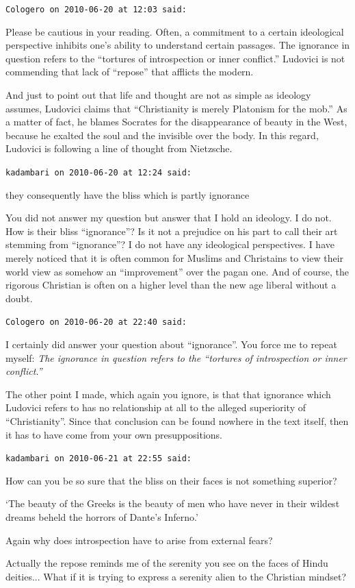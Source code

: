 \begin{footnotesize}
\begin{sffamily}
\hfill

\texttt{Cologero on 2010-06-20 at 12:03 said:}

Please be cautious in your reading. Often, a commitment to a certain ideological perspective inhibits one's ability to understand certain passages. The ignorance in question refers to the ``tortures of introspection or inner conflict.'' Ludovici is not commending that lack of ``repose'' that afflicts the modern.

And just to point out that life and thought are not as simple as ideology assumes, Ludovici claims that ``Christianity is merely Platonism for the mob.'' As a matter of fact, he blames Socrates for the disappearance of beauty in the West, because he exalted the soul and the invisible over the body. In this regard, Ludovici is following a line of thought from Nietzsche.

\hfill

\texttt{kadambari on 2010-06-20 at 12:24 said:}

they consequently have the bliss which is partly ignorance

You did not answer my question but answer that I hold an ideology. I do not. How is their bliss ``ignorance''? Is it not a prejudice on his part to call their art stemming from ``ignorance''? I do not have any ideological perspectives. I have merely noticed that it is often common for Muslims and Christains to view their world view as somehow an ``improvement'' over the pagan one. And of course, the rigorous Christian is often on a higher level than the new age liberal without a doubt.

\hfill

\texttt{Cologero on 2010-06-20 at 22:40 said:}

I certainly did answer your question about ``ignorance''. You force me to repeat myself: \emph{The ignorance in question refers to the ``tortures of introspection or inner conflict.''}

The other point I made, which again you ignore, is that that ignorance which Ludovici refers to has no relationship at all to the alleged superiority of ``Christianity''. Since that conclusion can be found nowhere in the text itself, then it has to have come from your own presuppositions.

\hfill

\texttt{kadambari on 2010-06-21 at 22:55 said:}

How can you be so sure that the bliss on their faces is not something superior?

`The beauty of the Greeks is the beauty of men who have never in their wildest dreams beheld the horrors of Dante's Inferno.'

Again why does introspection have to arise from external fears?

Actually the repose reminds me of the serenity you see on the faces of Hindu deities... What if it is trying to express a serenity alien to the Christian mindset?


\hfill

\end{sffamily}
\end{footnotesize}


